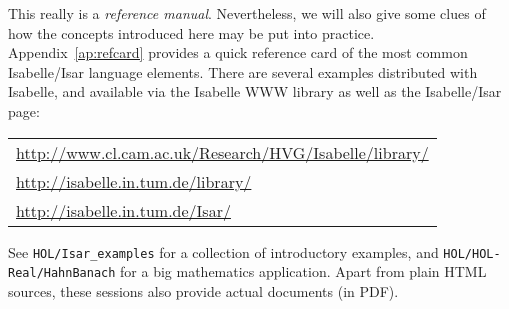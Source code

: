 \medskip This really is a \emph{reference manual}.  Nevertheless, we will also
give some clues of how the concepts introduced here may be put into practice.
Appendix~\ref{ap:refcard} provides a quick reference card of the most common
Isabelle/Isar language elements.  There are several examples distributed with
Isabelle, and available via the Isabelle WWW library as well as the
Isabelle/Isar page:
\begin{center}\small
  \begin{tabular}{l}
    \url{http://www.cl.cam.ac.uk/Research/HVG/Isabelle/library/} \\
    \url{http://isabelle.in.tum.de/library/} \\[1ex]
    \url{http://isabelle.in.tum.de/Isar/} \\
  \end{tabular}
\end{center}

See \texttt{HOL/Isar_examples} for a collection of introductory examples, and
\texttt{HOL/HOL-Real/HahnBanach} for a big mathematics application.  Apart
from plain HTML sources, these sessions also provide actual documents (in
PDF).


